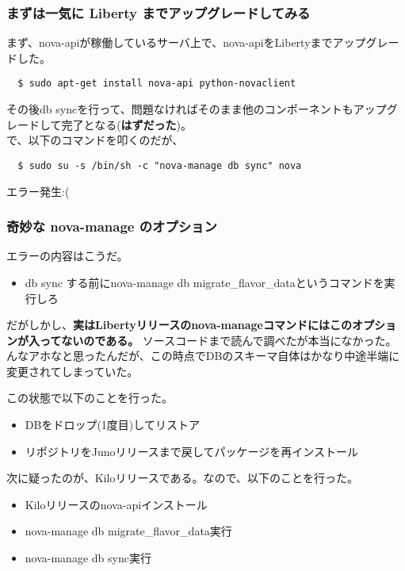 \documentclass[9pt,b5paper,tombo,openany]{jsbook}
\begin{document}
\subsubsection{まずは一気に Liberty までアップグレードしてみる}
\noindent
まず、nova-apiが稼働しているサーバ上で、nova-apiをLibertyまでアップグレードした。

\begin{lstlisting}
  $ sudo apt-get install nova-api python-novaclient
\end{lstlisting}

その後db syncを行って、問題なければそのまま他のコンポーネントもアップグレードして完了となる(\textbf{はずだった})。\\[1ex]

\noindent
で、以下のコマンドを叩くのだが、

\begin{lstlisting}
  $ sudo su -s /bin/sh -c "nova-manage db sync" nova
\end{lstlisting}

\noindent
エラー発生:(

\subsubsection{奇妙な nova-manage のオプション}
\noindent
エラーの内容はこうだ。

\begin{itemize}
	\item db sync する前にnova-manage db migrate\_flavor\_dataというコマンドを実行しろ
\end{itemize}

だがしかし、\textbf{実はLibertyリリースのnova-manageコマンドにはこのオプションが入ってないのである。} ソースコードまで読んで調べたが本当になかった。んなアホなと思ったんだが、この時点でDBのスキーマ自体はかなり中途半端に変更されてしまっていた。

\noindent
この状態で以下のことを行った。

\begin{itemize}
	\item DBをドロップ(1度目)してリストア
	\item リポジトリをJunoリリースまで戻してパッケージを再インストール
\end{itemize}

\noindent
次に疑ったのが、Kiloリリースである。なので、以下のことを行った。

\begin{itemize}
	\item Kiloリリースのnova-apiインストール
	\item nova-manage db migrate\_flavor\_data実行
	\item nova-manage db sync実行
\end{itemize}
\end{document}
